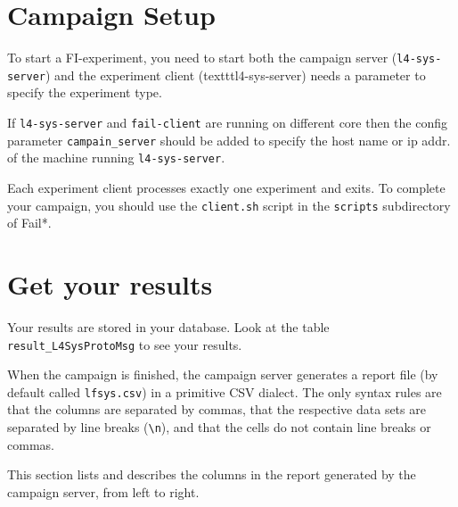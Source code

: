 \documentclass[a4paper,times,9pt]{article}
\begin{document}
\section{Campaign Setup}

To start a FI-experiment, you need to start both the campaign server 
(\verb+l4-sys-server+) and the experiment client (texttt{l4-sys-server})
needs a parameter to specify the experiment type.

If \verb+l4-sys-server+ and \verb+fail-client+ are running on 
different core then the config parameter \verb+campain_server+ should
be added to specify the host name or ip addr. of the machine running 
\verb+l4-sys-server+.

Each experiment client  processes exactly one experiment 
and exits. To complete your campaign, you should use the \verb+client.sh+
script in the \texttt{scripts} subdirectory of Fail*.


\section{Get your results}

Your results are stored in your database. Look at the table \verb+result_L4SysProtoMsg+
to see your results. 

\iffalse
When the campaign is finished, the campaign server generates a report
file (by default called \texttt{lfsys.csv}) in a primitive CSV dialect.
The only syntax rules are that the columns are separated by commas,
that the respective data sets are separated by line breaks (\verb+\n+),
and that the cells do not contain line breaks or commas.

This section lists and describes the columns in the report generated by
the campaign server, from left to right.
\end{document}
